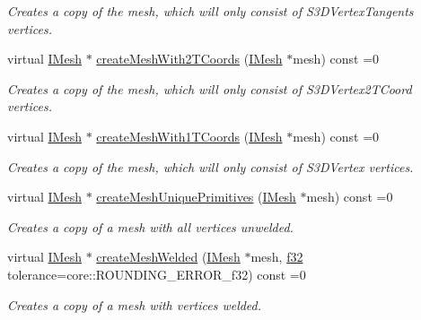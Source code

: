 \begin{DoxyCompactItemize}
\begin{DoxyCompactList}\small\item\em Creates a copy of the mesh, which will only consist of S3\+D\+Vertex\+Tangents vertices. \end{DoxyCompactList}\item 
virtual \hyperlink{classirr_1_1scene_1_1IMesh}{I\+Mesh} $\ast$ \hyperlink{classirr_1_1scene_1_1IMeshManipulator_abf123f6fece99816be402e1edf70dc13}{create\+Mesh\+With2\+T\+Coords} (\hyperlink{classirr_1_1scene_1_1IMesh}{I\+Mesh} $\ast$mesh) const =0
\begin{DoxyCompactList}\small\item\em Creates a copy of the mesh, which will only consist of S3\+D\+Vertex2\+T\+Coord vertices. \end{DoxyCompactList}\item 
virtual \hyperlink{classirr_1_1scene_1_1IMesh}{I\+Mesh} $\ast$ \hyperlink{classirr_1_1scene_1_1IMeshManipulator_af7feb558fbaad9671667d1332c83bb5d}{create\+Mesh\+With1\+T\+Coords} (\hyperlink{classirr_1_1scene_1_1IMesh}{I\+Mesh} $\ast$mesh) const =0
\begin{DoxyCompactList}\small\item\em Creates a copy of the mesh, which will only consist of S3\+D\+Vertex vertices. \end{DoxyCompactList}\item 
virtual \hyperlink{classirr_1_1scene_1_1IMesh}{I\+Mesh} $\ast$ \hyperlink{classirr_1_1scene_1_1IMeshManipulator_a73051bc082f128a2e0592fb1a3da2b7d}{create\+Mesh\+Unique\+Primitives} (\hyperlink{classirr_1_1scene_1_1IMesh}{I\+Mesh} $\ast$mesh) const =0
\begin{DoxyCompactList}\small\item\em Creates a copy of a mesh with all vertices unwelded. \end{DoxyCompactList}\item 
virtual \hyperlink{classirr_1_1scene_1_1IMesh}{I\+Mesh} $\ast$ \hyperlink{classirr_1_1scene_1_1IMeshManipulator_ac19065037302c0500cb6ebecefcc6c6d}{create\+Mesh\+Welded} (\hyperlink{classirr_1_1scene_1_1IMesh}{I\+Mesh} $\ast$mesh, \hyperlink{namespaceirr_a0277be98d67dc26ff93b1a6a1d086b07}{f32} tolerance=core\+::\+R\+O\+U\+N\+D\+I\+N\+G\+\_\+\+E\+R\+R\+O\+R\+\_\+f32) const =0
\begin{DoxyCompactList}\small\item\em Creates a copy of a mesh with vertices welded. \end{DoxyCompactList}\item 

\end{DoxyCompactItemize}
